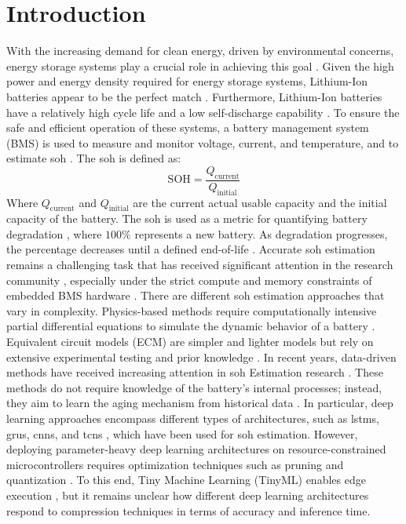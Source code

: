 \documentclass[final,3p,times]{elsarticle}
\begin{document}
\section{Introduction}
With the increasing demand for clean energy, driven by environmental concerns, energy storage systems play a crucial role in achieving this goal \cite{lin_towards_2022, ngoy_lithium-ion_2025}. Given the high power and energy density required for energy storage systems, Lithium-Ion batteries appear to be the perfect match \cite{chen_review_2021, khan_maximizing_2023}. Furthermore, Lithium-Ion batteries have a relatively high cycle life and a low self-discharge capability \cite{zhang_cycle_2024}. To ensure the safe and efficient operation of these systems, a battery management system (BMS) is used to measure and monitor voltage, current, and temperature, and to estimate \ac{soh} \cite{ali_towards_2019}. The \ac{soh} is defined as: 
\begin{equation}
    \text{SOH} = \frac{Q_\text{current}}{Q_\text{initial}} 
\end{equation}
Where $Q_\text{current}$ and $Q_\text{initial}$ are the current actual usable capacity and the initial capacity of the battery. The \ac{soh} is used as a metric for quantifying battery degradation \cite{tao_data-based_2024}, where $100 \%$ represents a new battery. As degradation progresses, the percentage decreases until a defined end-of-life \cite{jin_overview_2021}. Accurate \ac{soh} estimation remains a challenging task that has received significant attention in the research community \cite{yao_fast-adaptive_2025, tran_comprehensive_2021}, especially under the strict compute and memory constraints of embedded BMS hardware \cite{hu_onet_2026}. There are different \ac{soh} estimation approaches that vary in complexity. Physics-based methods require computationally intensive partial differential equations to simulate the dynamic behavior of a battery \cite{iurilli_physics-based_2022, tu_integrating_2023}. Equivalent circuit models (ECM) are simpler and lighter models but rely on extensive experimental testing and prior knowledge \cite{noura_review_2020, chang_improvement_2022}. 
In recent years, data-driven methods have received increasing attention in \ac{soh} Estimation research \cite{sylvestrin_state_2025}. These methods do not require knowledge of the battery's internal processes; instead, they aim to learn the aging mechanism from historical data \cite{yao_fast-adaptive_2025}. In particular, deep learning approaches encompass different types of architectures, such as \acp{lstm}, \acp{gru}, \acp{cnn}, and \acp{tcn} \cite{sylvestrin_state_2025, yang_state_2024}, which have been used for \ac{soh} estimation. However, deploying parameter-heavy deep learning architectures on resource-constrained microcontrollers requires optimization techniques such as pruning and quantization \cite{schulze_pq_2025}. To this end, Tiny Machine Learning (TinyML) enables edge execution \cite{pau_tiny_2024}, but it remains unclear how different deep learning architectures respond to compression techniques in terms of accuracy and inference time. 
\end{document}
